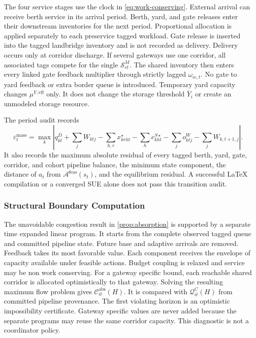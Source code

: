 \documentclass[a4paper,fleqn]{cas-sc}
\begin{document}
The four service stages use the clock in \cref{eq:work-conserving}. External
arrival can receive berth service in its arrival period. Berth, yard, and gate
releases enter their downstream inventories for the next period. Proportional
allocation is applied separately to each preservice tagged workload. Gate
release is inserted into the tagged landbridge inventory and is not recorded
as delivery. Delivery occurs only at corridor discharge. If several gateways
use one corridor, all associated tags compete for the single
$\mathcal S^M_{et}$. The shared inventory then enters every linked gate
feedback multiplier through strictly lagged $\omega_{ie,t}$. No gate to yard
feedback or extra border queue is introduced.
Temporary yard capacity changes $\mu^{Y,\mathrm{eff}}$ only. It does not change
the storage threshold $\bar Y_i$ or create an unmodeled storage resource.

The period audit records
\begin{equation}
 \varepsilon_t^{\mathrm{mass}}
 =\max_k\left|
 q^D_{kt}+\sum_jW_{ktj}
 -\sum_{h,r}x^\star_{krht}
 -\sum_he^{S\star}_{kht}
 -\sum_jo^W_{ktj}
 -\sum_jW_{k,t+1,j}
 \right|.
 \label{eq:algorithm-mass-audit}
\end{equation}
It also records the maximum absolute residual of every tagged berth, yard,
gate, corridor, and cohort pipeline balance, the minimum state component, the
distance of $a_t$ from $\mathcal A^{\mathrm{feas}}(s_t)$, and the equilibrium
residual. A successful LaTeX compilation or a converged SUE alone does not pass
this transition audit.

\subsubsection{Structural Boundary Computation}
The unavoidable congestion result in \cref{prop:absorption} is supported by a
separate time expanded linear program. It starts from the complete observed
tagged queue and committed pipeline state. Future base and adaptive arrivals
are removed. Feedback takes its most favorable value. Each component receives
the envelope of capacity available under feasible actions. Budget coupling is
relaxed and service may be non work conserving. For a gateway specific bound,
each reachable shared corridor is allocated optimistically to that gateway.
Solving the resulting maximum flow problem gives
$\mathcal C^{\mathrm{abs}}_{it}(H)$. It is compared with
$\mathcal Q^C_{it}(H)$ from committed pipeline provenance. The first violating
horizon is an optimistic impossibility certificate. Gateway specific values
are never added because the separate programs may reuse the same corridor
capacity. This diagnostic is not a coordinator policy.
\end{document}
